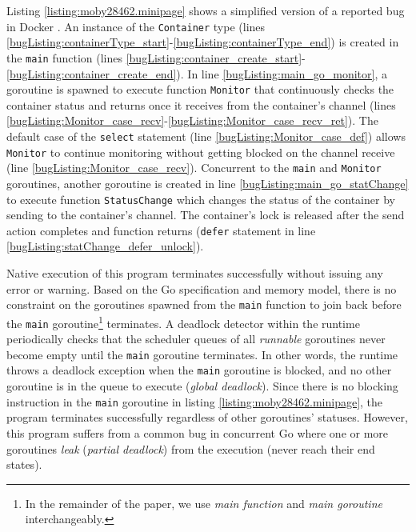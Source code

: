 %

Listing \ref{listing:moby28462.minipage} shows a simplified version of a reported bug in Docker \cite{moby-28462-commit}.
%
An instance of the \texttt{Container} type (lines \ref{bugListing:containerType_start}-\ref{bugListing:containerType_end}) is created in the \texttt{main} function (lines \ref{bugListing:container_create_start}-\ref{bugListing:container_create_end}).
%
In line \ref{bugListing:main_go_monitor}, a goroutine is spawned to execute function \texttt{Monitor} that continuously checks the container status and returns once it receives from the container's channel (lines \ref{bugListing:Monitor_case_recv}-\ref{bugListing:Monitor_case_recv_ret}).
%
The default case of the \texttt{select} statement (line \ref{bugListing:Monitor_case_def}) allows \texttt{Monitor} to continue monitoring without getting blocked on the channel receive (line \ref{bugListing:Monitor_case_recv}).
%
Concurrent to the \texttt{main} and \texttt{Monitor} goroutines, another goroutine is created in line  \ref{bugListing:main_go_statChange} to execute function \texttt{StatusChange} which changes the status of the container by sending to the container's channel.
%
The container's lock is released after the send action completes and function returns (\texttt{defer} statement in line \ref{bugListing:statChange_defer_unlock}).
%


Native execution of this program terminates successfully without issuing any error or warning.
%
Based on the Go specification and memory model, there is no constraint on the goroutines spawned from the \texttt{main} function to join back before the \texttt{main} goroutine\footnote{In the remainder of the paper, we use \textit{main function} and \textit{main goroutine} interchangeably.} terminates.
%
A deadlock detector within the runtime periodically checks that the scheduler queues of all \textit{runnable} goroutines never become empty until the \texttt{main} goroutine terminates.
%
In other words, the runtime throws a deadlock exception when the \texttt{main} goroutine is blocked, and no other goroutine is in the queue to execute (\ie \textit{global deadlock}).
%
Since there is no blocking instruction in the \texttt{main} goroutine in listing \ref{listing:moby28462.minipage}, the program terminates successfully regardless of other goroutines' statuses.
%
However, this program suffers from a common bug in concurrent Go where one or more goroutines \textit{leak} (\ie \textit{partial deadlock}) from the execution (\ie never reach their end states).

